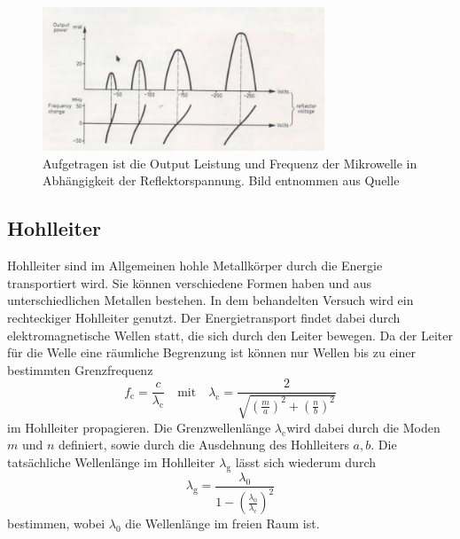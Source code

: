 \begin{figure}
    \centering
    \includegraphics[width=0.75\textwidth]{content/data/refelx_spannung_schema.png}
    \caption{Aufgetragen ist die Output Leistung und Frequenz der Mikrowelle in Abhängigkeit der Reflektorspannung. Bild entnommen aus Quelle \cite[6]{Anleitung}}
    \label{fig:output_refelktor_voltage}
\end{figure}
\FloatBarrier
\subsection{Hohlleiter}
Hohlleiter sind im Allgemeinen hohle Metallkörper durch die Energie transportiert wird.
Sie können verschiedene Formen haben und aus unterschiedlichen Metallen bestehen.
In dem behandelten Versuch wird ein rechteckiger Hohlleiter genutzt.
Der Energietransport findet dabei durch elektromagnetische Wellen statt, die sich durch den Leiter bewegen.
Da der Leiter für die Welle eine räumliche Begrenzung ist können nur Wellen bis zu einer bestimmten Grenzfrequenz
\begin{equation}
    f_\text{c} = \frac{c}{\lambda _\text{c}} \quad \text{mit} \quad \lambda _\text{c} = \frac{2}{\sqrt{ \left ( \frac{m}{a} \right )^2 + \left ( \frac{n}{b} \right )^2}}
    \label{eq:grenzwellenlaenge}
\end{equation}
im Hohlleiter propagieren.
Die Grenzwellenlänge $\lambda _\text{c} $wird dabei durch die Moden $m$ und $n$ definiert, sowie durch die Ausdehnung des Hohlleiters $a, b$.
Die tatsächliche Wellenlänge im Hohlleiter $\lambda _\text{g}$ lässt sich wiederum durch 
\begin{equation}
    \lambda _\text{g} = \frac{\lambda _{0}}{1 - \left ( \frac{\lambda _0}{\lambda _\text{c}} \right )^2}
    \label{eq:wellenlaenge_hohleiter}
\end{equation}
bestimmen, wobei $\lambda _0$ die Wellenlänge im freien Raum ist.


